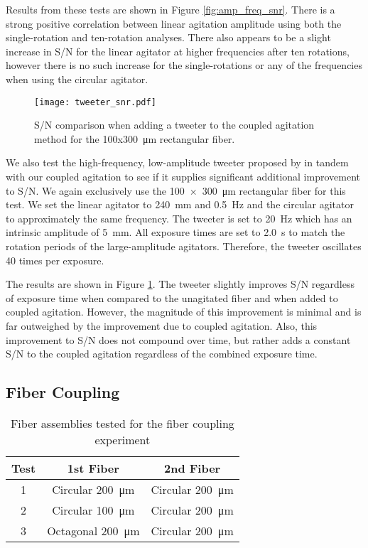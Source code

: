 \documentclass[twocolumn]{emulateapj}
\begin{document}
Results from these tests are shown in Figure \ref{fig:amp_freq_snr}. There is a strong positive correlation between linear agitation amplitude using both the single-rotation and ten-rotation analyses. There also appears to be a slight increase in S/N for the linear agitator at higher frequencies after ten rotations, however there is no such increase for the single-rotations or any of the frequencies when using the circular agitator.

\begin{figure}
\centering
	\texttt{[image: tweeter\_snr.pdf]}
	\caption{S/N comparison when adding a tweeter to the coupled agitation method for the 100x\SI{300}{\micro\meter} rectangular fiber.}
\label{fig:tweeter_snr}
\end{figure}

We also test the high-frequency, low-amplitude tweeter proposed by \citet{Plavchan2013} in tandem with our coupled agitation to see if it supplies significant additional improvement to S/N. We again exclusively use the \SI{100x300}{\micro\meter} rectangular fiber for this test. We set the linear agitator to \SI{240}{\milli\meter} and \SI{0.5}{\hertz} and the circular agitator to approximately the same frequency. The tweeter is set to \SI{20}{\hertz} which has an intrinsic amplitude of \SI{5}{\milli\meter}. All exposure times are set to \SI{2.0}{\second} to match the rotation periods of the large-amplitude agitators. Therefore, the tweeter oscillates 40 times per exposure.

The results are shown in Figure \ref{fig:tweeter_snr}. The tweeter slightly improves S/N regardless of exposure time when compared to the unagitated fiber and when added to coupled agitation. However, the magnitude of this improvement is minimal and is far outweighed by the improvement due to coupled agitation. Also, this improvement to S/N does not compound over time, but rather adds a constant S/N to the coupled agitation regardless of the combined exposure time.

\subsection{Fiber Coupling}

\begin{table}
\centering
\caption{Fiber assemblies tested for the fiber coupling experiment}
	\begin{tabular}{ccc}
	\hline
	Test & 1st Fiber & 2nd Fiber \\
	\hline \hline
	1 & Circular \SI{200}{\micro\meter} & Circular \SI{200}{\micro\meter} \\
	\hline
	2 & Circular \SI{100}{\micro\meter} & Circular \SI{200}{\micro\meter} \\
	\hline
	3 & Octagonal \SI{200}{\micro\meter} & Circular \SI{200}{\micro\meter} \\
	\hline
	\end{tabular}
\label{table:fiber_coupling}
\end{table}
\end{document}
